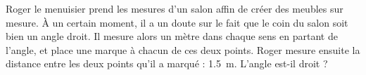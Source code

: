 
\begin{exercice}\label{exosmath-0832}

    Roger le menuisier prend les mesures d'un salon affin de créer des meubles sur mesure. À un certain moment, il a un doute sur le fait que le coin du salon soit bien un angle droit. Il mesure alors un mètre dans chaque sens en partant de l'angle, et place une marque à chacun de ces deux points. Roger mesure ensuite la distance entre les deux points qu'il a marqué : \SI{1.5}{\meter}. L'angle est-il droit ?

\end{exercice}
